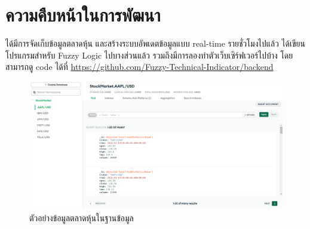 \chapter{ความคืบหน้าในการพัฒนา}
ได้มีการจัดเก็บข้อมูลตลาดหุ้น และสร้างระบบอัพเดตข้อมูลแบบ real-time รายชั่วโมงไปแล้ว ได้เขียนโปรแกรมสำหรับ Fuzzy Logic ไปบางส่วนแล้ว
รวมถึงมีการลองทำตัวเว็บเซิร์ฟเวอร์ไปบ้าง โดยสามารถดู code ได้ที่ \url{https://github.com/Fuzzy-Technical-Indicator/backend}

\begin{figure}[ht]
    \centering
    \includegraphics[width=\textwidth]{images/db_example.png}
    \caption{ตัวอย่างข้อมูลตลาดหุ้นในฐานข้อมูล}
\end{figure}


